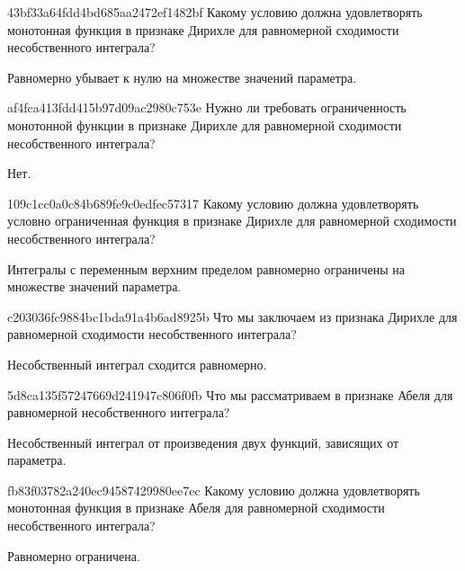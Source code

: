 \begin{note}{43bf33a64fdd4bd685aa2472ef1482bf}
    Какому условию должна удовлетворять монотонная функция в признаке Дирихле для равномерной сходимости несобственного интеграла?

    \begin{cloze}{1}
        Равномерно убывает к нулю на множестве значений параметра.
    \end{cloze}
\end{note}

\begin{note}{af4fca413fdd415b97d09ac2980c753e}
    Нужно ли требовать ограниченность монотонной функции в признаке Дирихле для равномерной сходимости несобственного интеграла?

    \begin{cloze}{1}
        Нет.
    \end{cloze}
\end{note}

\begin{note}{109c1cc0a0c84b689fe9c0edfec57317}
    Какому условию должна удовлетворять условно ограниченная функция в признаке Дирихле для равномерной сходимости несобственного интеграла?

    \begin{cloze}{1}
        Интегралы с переменным верхним пределом равномерно ограничены на множестве значений параметра.
    \end{cloze}
\end{note}

\begin{note}{c203036fc9884bc1bda91a4b6ad8925b}
    Что мы заключаем из признака Дирихле для равномерной сходимости несобственного интеграла?

    \begin{cloze}{1}
        Несобственный интеграл сходится равномерно.
    \end{cloze}
\end{note}

\begin{note}{5d8ca135f57247669d241947c806f0fb}
    Что мы рассматриваем в признаке Абеля для равномерной несобственного интеграла?

    \begin{cloze}{1}
        Несобственный интеграл от произведения двух функций, зависящих от параметра.
    \end{cloze}
\end{note}

\begin{note}{fb83f03782a240ec94587429980ee7ec}
    Какому условию должна удовлетворять монотонная функция в признаке Абеля для равномерной сходимости несобственного интеграла?

    \begin{cloze}{1}
        Равномерно ограничена.
    \end{cloze}
\end{note}


